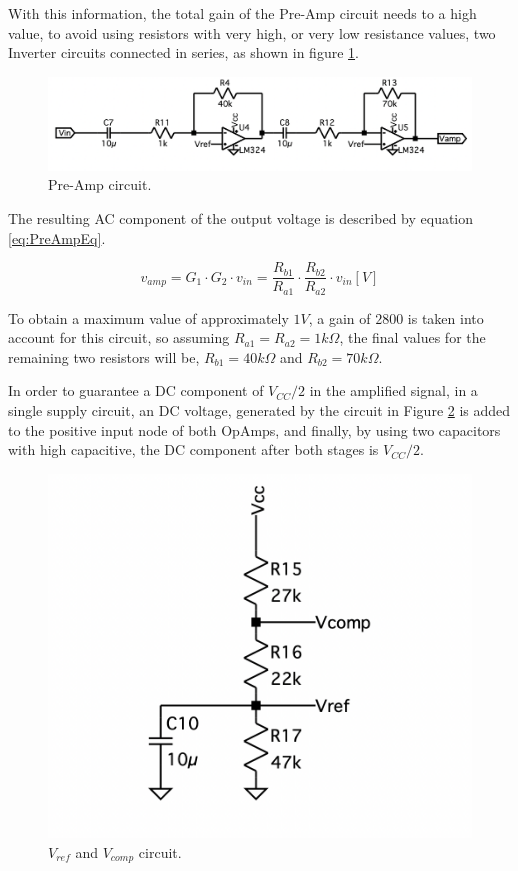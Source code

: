 With this information, the total gain of the Pre-Amp circuit needs to a high value, to avoid using resistors with very high, or very low resistance values, two Inverter circuits connected in series, as shown in figure \ref{fig:PreAmp}.

\begin{figure}[H]
    \centering
    \includegraphics*[scale = 0.5]{Images/PreAmp circuit.png}
    \caption{Pre-Amp circuit.}
    \label{fig:PreAmp}
\end{figure}

The resulting AC component of the output voltage is described by equation \ref{eq:PreAmpEq}.

\begin{equation}
    v_{amp} = G_1 \cdot G_2 \cdot v_{in} = \frac{R_{b1}}{R_{a1}} \cdot \frac{R_{b2}}{R_{a2}} \cdot v_{in} [V]
    \label{eq:PreAmpEq}
\end{equation}

To obtain a maximum value of approximately $1V$, a gain of $2800$ is taken into account for this circuit, so assuming $R_{a1} = R_{a2} = 1k\Omega$, the final values for the remaining two resistors will be, $R_{b1} = 40k\Omega$ and $R_{b2} = 70k\Omega$.

In order to guarantee a DC component of $V_{CC}/2$ in the amplified signal, in a single supply circuit, an DC voltage, generated by the circuit in Figure \ref{fig:VrefVcomp} is added to the positive input node of both OpAmps, and finally, by using two capacitors with high capacitive, the DC component after both stages is $V_{CC}/2$.

\begin{figure}[H]
    \centering
    \includegraphics*[scale = 0.3]{Images/VrefVcomp.png}
    \caption{$V_{ref}$ and $V_{comp}$ circuit.}
    \label{fig:VrefVcomp}
\end{figure}

